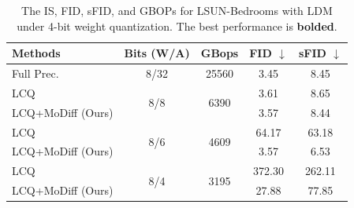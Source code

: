 \begin{table}[t!]
\small
\centering
\caption{The IS, FID, sFID, and GBOPs for LSUN-Bedrooms with LDM under 4-bit weight quantization. The best performance is \textbf{bolded}.}
\begin{tabular}{l|c|c|cc}
\toprule
{Methods} & {Bits (W/A)} & GBops & FID $\downarrow$ & sFID $\downarrow$ \\
\midrule
Full Prec. & 8/32 & 25560 & 3.45 & 8.45 \\
\midrule
LCQ & \multirow{2}{*}{8/8} & \multirow{2}{*}{6390}& 3.61 & 8.65 \\
LCQ+MoDiff (Ours) & && 3.57 & 8.44 \\
\midrule
LCQ & \multirow{2}{*}{8/6}&\multirow{2}{*}{4609} & 64.17 & 63.18 \\
LCQ+MoDiff (Ours) & && 3.57 & 6.53 \\
\midrule
LCQ & \multirow{2}{*}{8/4}&\multirow{2}{*}{3195} & 372.30 & 262.11 \\
LCQ+MoDiff (Ours) & && 27.88 & 77.85 \\
\bottomrule
\end{tabular}
\label{apptab:bedroom_w4}
\end{table}


